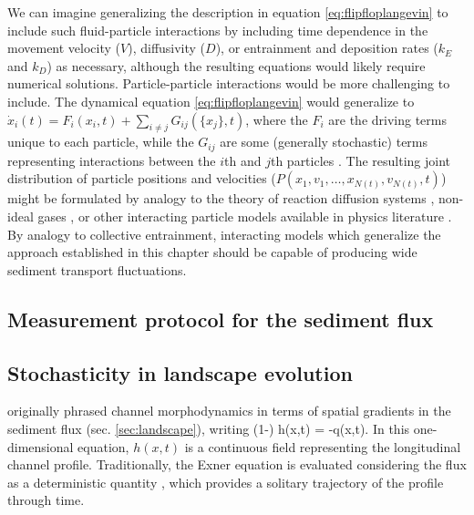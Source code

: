 We can imagine generalizing the description in equation \ref{eq:flipfloplangevin} to include such fluid-particle interactions by including time dependence in the movement velocity ($V$), diffusivity ($D$), or entrainment and deposition rates ($k_E$ and $k_D$) as necessary, although the resulting equations would likely require numerical solutions.
Particle-particle interactions would be more challenging to include.
The dynamical equation \ref{eq:flipfloplangevin} would generalize to $\dot{x}_i(t) = F_i(x_i,t) + \sum_{i\neq j}G_{ij}(\{x_j\},t)$, where the $F_i$ are the driving terms unique to each particle, while the $G_{ij}$ are some (generally stochastic) terms representing interactions between the $i$th and $j$th particles \citep{Goldstein1997}. The resulting joint distribution of particle positions and velocities ($P(x_1,v_1,\dots,x_{N(t)},v_{N(t)},t)$) might be formulated by analogy to the theory of reaction diffusion systems \citep{Pechenik1999, Cardy2008}, non-ideal gases \citep{Chapman1970,Brilliantov2004}, or other interacting particle models available in physics literature \citep{Hernandez2004,Escaff2018}. 
By analogy to collective entrainment, interacting models which generalize the approach established in this chapter should be capable of producing wide sediment transport fluctuations.

\subsection{Measurement protocol for the sediment flux}




\subsection{Stochasticity in landscape evolution}

\citet{Exner1925} originally phrased channel morphodynamics in terms of spatial gradients in the sediment flux (sec. \ref{sec:landscape}), writing
\be (1-\phi) \pt h(x,t) = -\px q(x,t). \label{eq:stocEx}\ee
In this one-dimensional equation, $h(x,t)$ is a continuous field representing the longitudinal channel profile.
Traditionally, the Exner equation is evaluated considering the flux as a deterministic quantity \citep{Parker2007,Viparelli2011,An2017}, which provides a solitary trajectory of the profile through time.

